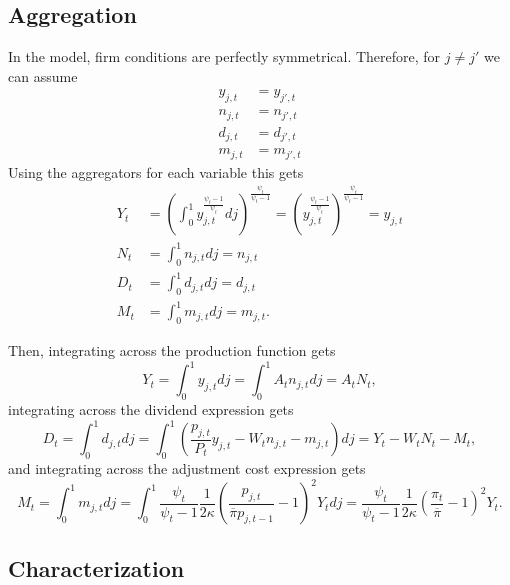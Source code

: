 \subsection{Aggregation}

In the model, firm conditions are perfectly symmetrical. Therefore, for $j \neq j'$ we can assume
\begin{align*}
    y_{j, t} &= y_{j', t} \\
    n_{j, t} &= n_{j', t} \\
    d_{j, t} &= d_{j', t} \\
    m_{j, t} &= m_{j', t}
\end{align*}
Using the aggregators for each variable this gets
\begin{align*}
    Y_t &= \left( \int_0^1 y_{j, t}^\frac{\psi_t - 1}{\psi_t} dj \right)^\frac{\psi_t}{\psi_t - 1} = \left( y_{j, t}^\frac{\psi_t - 1}{\psi_t} \right)^\frac{\psi_t}{\psi_t - 1} = y_{j, t} \\
    N_t &= \int_0^1 n_{j, t} dj = n_{j, t} \\
    D_t &= \int_0^1 d_{j, t} dj = d_{j, t} \\
    M_t &= \int_0^1 m_{j, t} dj = m_{j, t}.
\end{align*}

Then, integrating across the production function gets
\begin{equation*}
    Y_t = \int_0^1 y_{j, t} dj = \int_0^1 A_t n_{j, t} dj = A_t N_t,
\end{equation*}
integrating across the dividend expression gets
\begin{equation*}
    D_t = \int_0^1 d_{j, t} dj = \int_0^1 \left( \frac{p_{j, t}}{P_t} y_{j, t} - W_t n_{j, t} - m_{j, t} \right) dj = Y_t - W_t N_t - M_t,
\end{equation*}
and integrating across the adjustment cost expression gets
\begin{equation*}
    M_t = \int_0^1 m_{j, t} dj = \int_0^1 \frac{\psi_t}{\psi_t - 1}  \frac{1}{2 \kappa} \left(\frac{p_{j, t}}{\overline{\pi} p_{j, t - 1}} - 1\right)^2 Y_t dj = \frac{\psi_t}{\psi_t - 1} \frac{1}{2 \kappa} \left( \frac{\pi_t}{\overline{\pi}} - 1 \right)^2 Y_t.
\end{equation*}


\subsection{Characterization}

